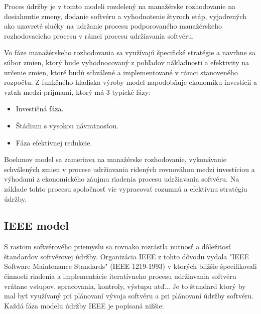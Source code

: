 \documentclass[10pt,twoside,slovak,a4paper]{article}
\begin{document}
Proces údržby je v tomto modeli rozdelený na manažérske rozhodovanie na dosiahnutie zmeny, dodanie softvéru a vyhodnotenie štyroch etáp, vyjadrených ako uzavreté slučky na udržanie procesu podporovaného manažérskeho rozhodovacieho procesu v rámci procesu udržiavania softvéru.\cite{6116869}

Vo fáze manažérskeho rozhodovania sa využívajú špecifické stratégie a
navrhne sa súbor zmien, ktorý bude vyhodnocovaný z pohľadov nákladnosti a efektivity na určenie zmien, ktoré budú schválené a implementované v rámci stanoveného rozpočtu.
Z funkčného hľadiska výroby model napodobňuje ekonomiku investícií a vzťah medzi príjmami, ktorý má 3 typické fázy:\cite{6116869}

\begin{itemize}
    \item Investičná fáza.\cite{6116869}
    \item Štádium s vysokou návratnosťou.\cite{6116869}
    \item Fáza efektívnej redukcie.\cite{6116869}
\end{itemize}

Boehmov model sa zameriava na manažérske rozhodovanie, vykonávanie schválených zmien v procese udržiavania ridených rovnováhou medzi investíciou a výhodami z ekonomického záujmu riadenia procesu udržiavania softvéru. Na základe tohto procesu spoločnosť vie vypracovať rozumnú a efektívnu stratégiu údržby.\cite{6116869}

\subsection{IEEE model} \label{modely:IEEE}
S rastom softvérového priemyslu sa rovnako rozrástla nutnosť a dôležitosť štandardov softvérovej údržby. Organizácia IEEE z tohto dôvodu vydala "IEEE
Software Maintenance Standards" (IEEE 1219-1993) v ktorých bližšie špecifikovali činnosti riadenia a implementácie iteratívneho procesu udržiavania softvéru vrátane vstupov, spracovania, kontroly, výstupu atď... Je to štandard ktorý by mal byť využívaný pri plánovaní vývoja softvéru a pri plánovaní údržby softvéru. Každá fáza modelu údržby IEEE je popísaná nižšie:\cite{6116869}
\end{document}
